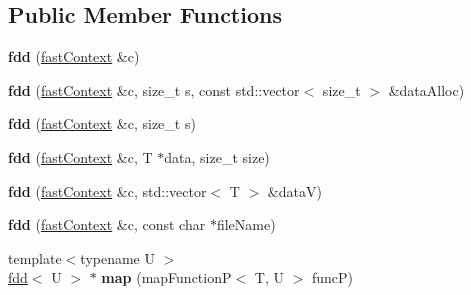 \subsection*{Public Member Functions}
\begin{DoxyCompactItemize}
\item 
\hypertarget{classfaster_1_1fdd_a1f61fd1cb290f8d2f7570eb9f260866f}{}{\bfseries fdd} (\hyperlink{classfaster_1_1fastContext}{fast\+Context} \&c)\label{classfaster_1_1fdd_a1f61fd1cb290f8d2f7570eb9f260866f}

\item 
\hypertarget{classfaster_1_1fdd_a0ab5257609851930bd86b4de3094e8b4}{}{\bfseries fdd} (\hyperlink{classfaster_1_1fastContext}{fast\+Context} \&c, size\+\_\+t s, const std\+::vector$<$ size\+\_\+t $>$ \&data\+Alloc)\label{classfaster_1_1fdd_a0ab5257609851930bd86b4de3094e8b4}

\item 
\hypertarget{classfaster_1_1fdd_af37f3ee02b11f4e0c7b0cc9f0e241dee}{}{\bfseries fdd} (\hyperlink{classfaster_1_1fastContext}{fast\+Context} \&c, size\+\_\+t s)\label{classfaster_1_1fdd_af37f3ee02b11f4e0c7b0cc9f0e241dee}

\item 
\hypertarget{classfaster_1_1fdd_aa5b44359537e276d46a8902758501839}{}{\bfseries fdd} (\hyperlink{classfaster_1_1fastContext}{fast\+Context} \&c, T $\ast$data, size\+\_\+t size)\label{classfaster_1_1fdd_aa5b44359537e276d46a8902758501839}

\item 
\hypertarget{classfaster_1_1fdd_a76eee3a3adcb360d9b63bb50c1214de3}{}{\bfseries fdd} (\hyperlink{classfaster_1_1fastContext}{fast\+Context} \&c, std\+::vector$<$ T $>$ \&data\+V)\label{classfaster_1_1fdd_a76eee3a3adcb360d9b63bb50c1214de3}

\item 
\hypertarget{classfaster_1_1fdd_adc3ebc12c9d508b2957f5e6759544bee}{}{\bfseries fdd} (\hyperlink{classfaster_1_1fastContext}{fast\+Context} \&c, const char $\ast$file\+Name)\label{classfaster_1_1fdd_adc3ebc12c9d508b2957f5e6759544bee}

\item 
\hypertarget{classfaster_1_1fdd_a214d07df3240baf348492f9a4186d5cc}{}{\footnotesize template$<$typename U $>$ }\\\hyperlink{classfaster_1_1fdd}{fdd}$<$ U $>$ $\ast$ {\bfseries map} (map\+Function\+P$<$ T, U $>$ func\+P)\label{classfaster_1_1fdd_a214d07df3240baf348492f9a4186d5cc}


\end{DoxyCompactItemize}
